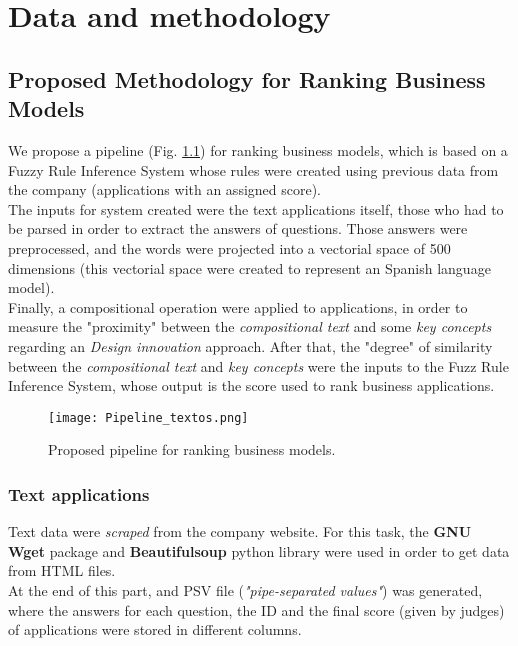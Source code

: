 
\chapter{Data and methodology}
\label{ch:methodology}

\section{Proposed Methodology for Ranking Business Models}
%
  We propose a pipeline (Fig. \ref{fig:pipeline}) for ranking business models, which is based on a Fuzzy Rule Inference System whose rules were created using previous data from the company (applications with an assigned score). \\
 The inputs for system created were the text applications itself, those who had to be parsed in order to extract the answers of questions. Those answers were preprocessed, and the words were projected into a vectorial space of 500 dimensions (this vectorial space were created to represent an Spanish language model). \\
 Finally, a compositional operation were applied to applications, in order to measure the "proximity" between the \textit{compositional text} and some \textit{key concepts} regarding an \textit{Design innovation} approach. After that, the "degree" of similarity between the \textit{compositional text} and \textit{key concepts} were the inputs to the Fuzz Rule Inference System, whose output is the score used to rank business applications. 
 
\begin{figure}[h]
	\label{fig:pipeline}
	\texttt{[image: Pipeline\_textos.png]}
    \caption{Proposed pipeline for ranking business models.}
\end{figure}

\subsection{Text applications}
Text data were \textit{scraped} from the company website. For this task, the \textbf{GNU Wget} package and \textbf{Beautifulsoup} python library were used in order to get data from HTML files. \\
At the end of this part, and PSV file (\textit{"pipe-separated values"}) was generated, where the answers for each question,  the ID and the final score (given by judges) of applications were stored in different columns.

